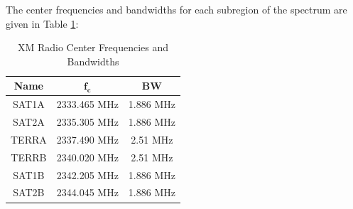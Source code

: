 \documentclass[conference,onecolumn]{IEEEtran}
\begin{document}
\noindent The center frequencies and bandwidths for each subregion of the spectrum are given in Table \ref{table::center_freq_and_bw}:
\vspace{-12pt}
\begin{table}[H]
	\begin{center}
	\caption{XM Radio Center Frequencies and Bandwidths \cite{andreas_2010_us8594559b2}}
	\label{table::center_freq_and_bw}
	\begin{tabular}{| c | c | c |}
		\hline
		\textbf{Name} & $\mathbf{f_c}$ & \textbf{BW}\\
		\hline
		SAT1A	& 2333.465 MHz & 1.886 MHz\\
		\hline
		SAT2A	& 2335.305 MHz & 1.886 MHz\\
		\hline
		TERRA & 2337.490 MHz & 2.51 MHz \\
		\hline
		TERRB & 2340.020 MHz & 2.51 MHz \\
		\hline
		SAT1B	& 2342.205 MHz & 1.886 MHz\\
		\hline
		SAT2B	& 2344.045 MHz & 1.886 MHz\\
		\hline
	\end{tabular}
	\end{center}
\end{table}

\end{document}
